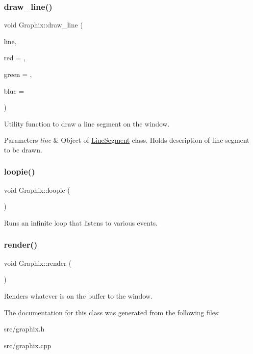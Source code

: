 \subsubsection{\texorpdfstring{draw\+\_\+line()}{draw\_line()}}
{\footnotesize\ttfamily void Graphix\+::draw\+\_\+line (\begin{DoxyParamCaption}\item[{\hyperlink{classLineSegment}{Line\+Segment}}]{line,  }\item[{G\+Lfloat}]{red = {},  }\item[{G\+Lfloat}]{green = {},  }\item[{G\+Lfloat}]{blue = {} }\end{DoxyParamCaption})}

Utility function to draw a line segment on the window. 
\begin{DoxyParams}{Parameters}
{\em line} & Object of \hyperlink{classLineSegment}{Line\+Segment} class. Holds description of line segment to be drawn. \\
\hline
\end{DoxyParams}
\mbox{\label{classGraphix_af7b539b3ab40274dc2f89d060cba0c51}} 
\subsubsection{\texorpdfstring{loopie()}{loopie()}}
{\footnotesize\ttfamily void Graphix\+::loopie (\begin{DoxyParamCaption}{ }\end{DoxyParamCaption})}

Runs an infinite loop that listens to various events. \mbox{\label{classGraphix_a3e24075d5ded3741a9c14a7978b721d8}} 
\subsubsection{\texorpdfstring{render()}{render()}}
{\footnotesize\ttfamily void Graphix\+::render (\begin{DoxyParamCaption}{ }\end{DoxyParamCaption})}

Renders whatever is on the buffer to the window. 

The documentation for this class was generated from the following files\+:\begin{DoxyCompactItemize}
\item 
src/graphix.\+h\item 
src/graphix.\+cpp\end{DoxyCompactItemize}
